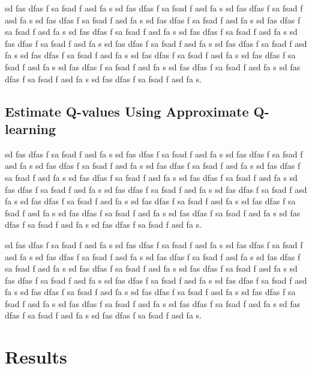 \documentclass{article}
\begin{document}
sd fas dfas f sa fsad f asd fa s sd fas dfas f sa fsad f asd fa s sd fas dfas f sa fsad f asd fa s
sd fas dfas f sa fsad f asd fa s sd fas dfas f sa fsad f asd fa s sd fas dfas f sa fsad f asd fa s
sd fas dfas f sa fsad f asd fa s sd fas dfas f sa fsad f asd fa s sd fas dfas f sa fsad f asd fa s
sd fas dfas f sa fsad f asd fa s sd fas dfas f sa fsad f asd fa s sd fas dfas f sa fsad f asd fa s
sd fas dfas f sa fsad f asd fa s sd fas dfas f sa fsad f asd fa s sd fas dfas f sa fsad f asd fa s
sd fas dfas f sa fsad f asd fa s sd fas dfas f sa fsad f asd fa s sd fas dfas f sa fsad f asd fa s.

\subsection{Estimate Q-values Using Approximate Q-learning}

sd fas dfas f sa fsad f asd fa s sd fas dfas f sa fsad f asd fa s sd fas dfas f sa fsad f asd fa s
sd fas dfas f sa fsad f asd fa s sd fas dfas f sa fsad f asd fa s sd fas dfas f sa fsad f asd fa s
sd fas dfas f sa fsad f asd fa s sd fas dfas f sa fsad f asd fa s sd fas dfas f sa fsad f asd fa s
sd fas dfas f sa fsad f asd fa s sd fas dfas f sa fsad f asd fa s sd fas dfas f sa fsad f asd fa s
sd fas dfas f sa fsad f asd fa s sd fas dfas f sa fsad f asd fa s sd fas dfas f sa fsad f asd fa s
sd fas dfas f sa fsad f asd fa s sd fas dfas f sa fsad f asd fa s sd fas dfas f sa fsad f asd fa s.

sd fas dfas f sa fsad f asd fa s sd fas dfas f sa fsad f asd fa s sd fas dfas f sa fsad f asd fa s
sd fas dfas f sa fsad f asd fa s sd fas dfas f sa fsad f asd fa s sd fas dfas f sa fsad f asd fa s
sd fas dfas f sa fsad f asd fa s sd fas dfas f sa fsad f asd fa s sd fas dfas f sa fsad f asd fa s
sd fas dfas f sa fsad f asd fa s sd fas dfas f sa fsad f asd fa s sd fas dfas f sa fsad f asd fa s
sd fas dfas f sa fsad f asd fa s sd fas dfas f sa fsad f asd fa s sd fas dfas f sa fsad f asd fa s
sd fas dfas f sa fsad f asd fa s sd fas dfas f sa fsad f asd fa s sd fas dfas f sa fsad f asd fa s.

\section{Results}
\end{document}
